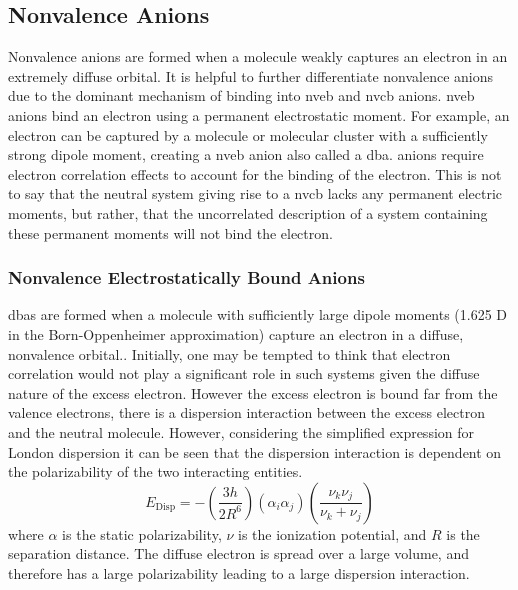 \subsection{Nonvalence Anions}

Nonvalence anions are formed when a molecule weakly captures an electron in an extremely diffuse orbital.
It is helpful to further differentiate nonvalence anions due to the dominant mechanism of binding into \gls{nveb} and \gls{nvcb} anions.
\Gls{nveb} anions bind an electron using a permanent electrostatic moment.
For example, an electron can be captured by a molecule or molecular cluster with a sufficiently strong dipole moment, creating a \gls{nveb} anion also called a \gls{dba}.
 anions require electron correlation effects to account for the binding of the electron.
This is not to say that the neutral system giving rise to a \gls{nvcb} lacks any permanent electric moments, but rather, that the uncorrelated description of a system containing these permanent moments will not bind the electron.

\subsubsection{Nonvalence Electrostatically Bound Anions}

\Glspl{dba} are formed when a molecule with sufficiently large dipole moments (1.625 D in the Born-Oppenheimer approximation) capture an electron in a diffuse, nonvalence orbital.\cite{10.1063/1.432599,10.1103/PhysRevA.54.1906,10.1063/1.453801,10.1103/PhysRev.72.399,10.1103/PhysRev.174.81,10.1088/0370-1328/91/2/303,10.1016/0009-26147080045-8,10.1103/PhysRevA.3.961,10.1103/PhysRevA.3.961,10.1103/PhysRevLett.73.2436,10.1103/PhysRevLett.73.2436,10.1146/annurev.physchem.54.011002.103851}.
Initially, one may be tempted to think that electron correlation would not play a significant role in such systems given the diffuse nature of the excess electron.
However the excess electron is bound far from the valence electrons, there is a dispersion interaction between the excess electron and the neutral molecule.\cite{10.1021/jp972600z,10.1021/jp980123u}
However, considering the simplified expression for London dispersion it can be seen that the dispersion interaction is dependent on the polarizability of the two interacting entities.\cite{10.1039/TF937330008B}
\begin{equation}
	E_{\mathrm{Disp}} = -\left(\frac{3h}{2R^6}\right) \left(\alpha_i \alpha_j \right) \left(\frac{\nu_k \nu_j}{\nu_k + \nu_j} \right)
\end{equation}
where $\alpha$ is the static polarizability, $\nu$ is the ionization potential, and $R$ is the separation distance.
The diffuse electron is spread over a large volume, and therefore has a large polarizability leading to a large dispersion interaction.


